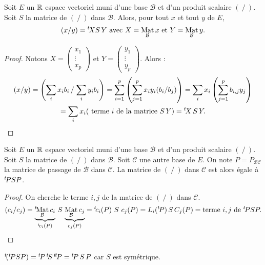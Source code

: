 \begin{prop}
Soit $E$ un $\mathbb{R}$ espace vectoriel muni d'une base $\mathcal{B}$ et d'un produit scalaire  $(~/~)$. Soit $S$ la matrice de $(~/~)$ dans $\mathcal{B}$. Alors, pour tout $x$ et tout $y$ de $E$,
\begin{displaymath}
(x/y) = \mathstrut^t\! X S\,Y \text{ avec } X = \mathop{\mathrm{Mat}}_\mathcal{B} x \text{ et } Y = \mathop{\mathrm{Mat}}_\mathcal{B} y .
\end{displaymath}
\end{prop}
\begin{proof}
Notons $X = \begin{pmatrix} x_1 \\ \vdots \\ x_p \end{pmatrix}$ et $Y = \begin{pmatrix} y_1 \\ \vdots \\ y_p \end{pmatrix}$. Alors :
\begin{multline*}
(x/y) = \left( \sum_{i} x_i b_i \left/ \right. \sum_{i} y_i b_i \right)
 = \sum_{i=1}^{p} \left( \sum_{j=1}^{p} x_i y_i (b_i/b_j) \right)
 = \sum_{i} x_i \left( \sum_{j=1}^{p} b_{i,j} y_j \right)\\
 = \sum_{i} x_i (\text{ terme $i$ de la matrice }S\,Y) = \mathstrut^t\! X\,S\,Y .
\end{multline*}
\end{proof}
\begin{prop}
Soit $E$ un $\mathbb{R}$ espace vectoriel muni d'une base $\mathcal{B}$ et d'un produit scalaire  $(~/~)$. Soit $S$ la matrice de $(~/~)$ dans $\mathcal{B}$. Soit $\mathcal{C}$ une autre base de $E$. On note $P = P_{\mathcal{BC}}$ la matrice de passage de $\mathcal{B}$ dans $\mathcal{C}$.\newline
La matrice de $(~/~)$ dans $\mathcal{C}$ est alors égale à $\mathstrut^t\! P SP$.
\end{prop}
\begin{proof}
On cherche le terme $i,j$ de la matrice de $(~/~)$ dans $\mathcal{C}$.
\begin{displaymath}
(c_i/c_j) = \underset{\mathstrut^t\!{c_i(P)}}{\underbrace{\mathstrut^t\! {\mathop{\mathrm{Mat}}_{\mathcal{B}} c_i}}}~S~\underset{c_j(P)}{\underbrace{\mathop{\mathrm{Mat}}_{\mathcal{B}} c_j}} 
= \mathstrut^t\!{ c_i(P) }~S~c_j(P)  = L_i( \mathstrut^t\! P )\, S\, C_j(P) = \text{terme }i,j\text{ de }\mathstrut^t\! P S P .
\end{displaymath}
\end{proof}
\begin{rem}
$\mathstrut^t\!{(\mathstrut^t\! PSP)} = \mathstrut^t\! P\,\mathstrut^t\!{S}\,\mathstrut^t\!{\mathstrut^t\! P} = \mathstrut^t\! P\,S\,P$ car $S$ est symétrique.
\end{rem}

